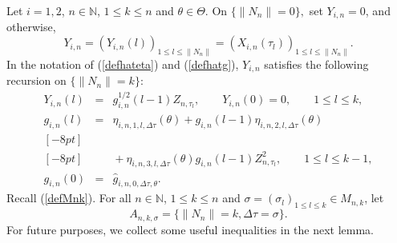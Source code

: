\documentclass[number,citesort,seceqn,dvips]{arxbj}
\newcommand{\eqref}[1]{(\ref{#1})}
\newcommand{\NN}{\mathbb{N}}
\begin{document}
Let $i=1,2$, $n\in\NN$, $1 \le  k \le  n$ and $\theta\in
\Theta$. On
$\{\|N_n\|=0\},$ set $Y_{i,n}=0$, and otherwise,
%
\begin{equation}\label{defYipfam}
Y_{i,n} = (Y_{i,n}(l))_{1\le l\le\|N_n\|} = (X_{i,n}(\tau
_l))_{1\le
l\le\|N_n\|} .
\end{equation}
%
In the notation of \eqref{defhateta} and \eqref{defhatg}, $Y_{i,n}$
satisfies the following recursion on $\{\|N_n\|=k\}$:
%
\begin{eqnarray}\label{Yip}
Y_{i,n}(l) & = &
g^{1/2}_{i,n}(l - 1) Z_{n,\tau_l} ,\qquad
Y_{i,n}(0) = 0 ,\qquad 1 \le  l \le k ,\nonumber \\
g_{i,n}(l) & = & \eta_{i,n,1,l,\Delta\tau}(\theta)+
g_{i,n}(l - 1) \eta_{i,n,2,l,\Delta\tau}(\theta)\nonumber\\ [-8pt]\\ [-8pt]
&&{} +\eta_{i,n,3,l,\Delta\tau}(\theta)
 g_{i,n}(l - 1) Z_{n,\tau_l}^2 ,\qquad  1 \le  l \le
k - 1 ,\nonumber \\
g_{i,n}(0)&=&\hat g_{i,n,0,\Delta\tau,\theta} .\nonumber
\end{eqnarray}
%
Recall \eqref{defMnk}. For all $n\in\NN$, $1 \le  k \le  n$ and
$\sigma=(\sigma_l)_{1\le l\le k}\in M_{n,k}$, let
%
\begin{equation}\label{defANK}
A_{n,k,\sigma} =  \{
\|N_n\| = k , \Delta\tau = \sigma \} .
\end{equation}
%
For
future purposes, we collect some useful inequalities in the next lemma.

%
\end{document}

